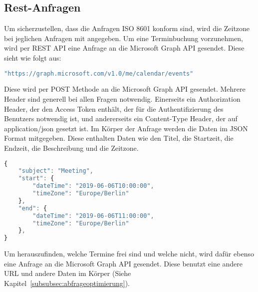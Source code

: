 \subsection{Rest-Anfragen}\label{subsec:rest-anfragen}

\newline
Um sicherzustellen, dass die Anfragen ISO 8601 konform sind, wird die Zeitzone bei jeglichen Anfragen mit angegeben.
Um eine Terminbuchung vorzunehmen, wird per REST API eine Anfrage an die Microsoft Graph API gesendet.
\newline
Diese sieht wie folgt aus:
\newline
\begin{lstlisting}[language=JavaScript,label={lst:JavaScript REST API Anfrage}]
"https://graph.microsoft.com/v1.0/me/calendar/events"
\end{lstlisting}
Diese wird per POST Methode an die Microsoft Graph API gesendet.
Mehrere Header sind generell bei allen Fragen notwendig.
Einerseits ein Authorization Header, der den Access Token enthält, der für die Authentifizierung des Benutzers notwendig ist, und andererseits ein Content-Type Header, der auf application/json gesetzt ist.
\newline
Im Körper der Anfrage werden die Daten im JSON Format mitgegeben.
Diese enthalten Daten wie den Titel, die Startzeit, die Endzeit, die Beschreibung und die Zeitzone.
\newline
\begin{lstlisting}[language=JavaScript,label={lst:JavaScript REST API Körper}]
{
    "subject": "Meeting",
    "start": {
        "dateTime": "2019-06-06T10:00:00",
        "timeZone": "Europe/Berlin"
    },
    "end": {
        "dateTime": "2019-06-06T11:00:00",
        "timeZone": "Europe/Berlin"
    },
}
    \end{lstlisting}
\newline
\newline
Um herauszufinden, welche Termine frei sind und welche nicht, wird dafür ebenso eine Anfrage an die Microsoft Graph API gesendet.
Diese benutzt eine andere URL und andere Daten im Körper (Siehe Kapitel~\ref{subsubsec:abfrageoptimierung}).
